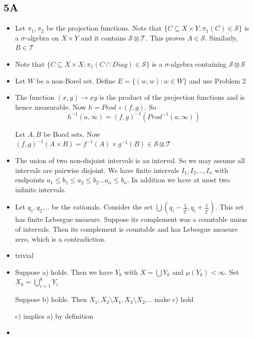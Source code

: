 \documentclass{article}
\begin{document}
\subsection*{5A}
\begin{itemize}
    \item [1] Let $\pi_1,\pi_2$ be the projection functions. Note that $\{C \subseteq X \times Y:\pi_1(C)\in \mathcal{S}\}$ is a $\sigma$-algebra on $X \times Y$ and it contains $\mathcal{S}\otimes\mathcal{T}$. This proves $A \in \mathcal{S}$. Similarly, $B \in \mathcal{T}$
    
    \item[2] Note that $\{C \subseteq X \times X:\pi_1(C \cap Diag)\in \mathcal{S}\}$ is a $\sigma$-algebra containing $\mathcal{S} \otimes \mathcal{S}$

    \item [3] Let $W$ be a non-Borel set. Define $E=\{(w,w):w \in W\}$ and use Problem 2

    \item [4] The function $(x,y)\to xy$ is the product of the projection functions and is hence measurable. Now $h=Prod \ \circ (f,g)$. So \[h^{-1}(a,\infty)=(f,g)^{-1}(Prod^{-1}(a,\infty))\]

    Let $A,B$ be Borel sets. Now $(f,g)^{-1}(A\times B)=f^{-1}(A)\times g^{-1}(B)\in \mathcal{S}\otimes\mathcal{T}$

    \item[5] The union of two non-disjoint intervals is an interval. So we may assume all intervals are pairwise disjoint. We have finite intervals $I_1,I_2,..,I_n$ with endpoints $a_1\leq b_1\leq a_2 \leq b_2...a_n\leq b_n$. In addition we have at most two infinite intervals.

    \item [6] Let $q_1,q_2,..$ be the rationals. Consider the set $\bigcup(q_i-\frac{1}{2^i},q_i+\frac{1}{2^i})$. This set has finite Lebesgue measure. Suppose its complement was a countable union of intervals. Then its complement is countable and has Lebesgue measure zero, which is a contradiction.

    \item[7] trivial

    \item[8] Suppose a) holds. Then we have $Y_k$ with $X=\bigcup Y_k$ and $\mu(Y_k)<\infty$. Set $X_k=\bigcup_{i=1}^k Y_i$ 

    Suppose b) holds. Then $X_1,X_2 \setminus X_1,X_3\setminus X_2,..$ make c) hold

    c) implies a) by definition

    \item[9] 

\end{itemize}
\end{document}
